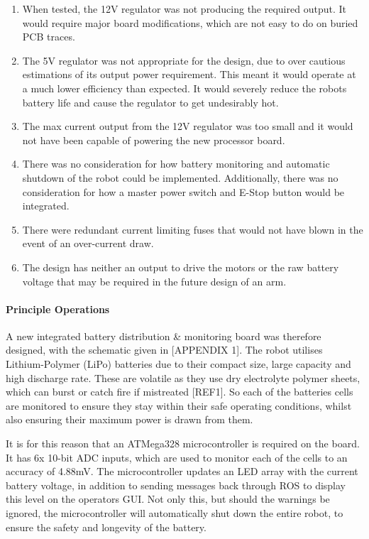 \begin{enumerate}
\item When tested, the 12V regulator was not producing the required output. It would require major board modifications, which are not easy to do on buried PCB traces.
\item The 5V regulator was not appropriate for the design, due to over cautious estimations of its output power requirement. This meant it would operate at a much lower efficiency than expected. It would severely reduce the robots battery life and cause the regulator to get undesirably hot. 
\item The max current output from the 12V regulator was too small and it would not have been capable of powering the new processor board. 
\item There was no consideration for how battery monitoring and automatic shutdown of the robot could be implemented. Additionally, there was no consideration for how a master power switch and E-Stop button would be integrated. 
\item There were redundant current limiting fuses that would not have blown in the event of an over-current draw.
\item The design has neither an output to drive the motors or the raw battery voltage that may be required in the future design of an arm.
\end{enumerate}

\paragraph{Principle Operations}
A new integrated battery distribution \& monitoring board was therefore designed, with the schematic given in [APPENDIX 1]. The robot utilises Lithium-Polymer (LiPo) batteries due to their compact size, large capacity and high discharge rate. These are volatile as they use dry electrolyte polymer sheets, which can burst or catch fire if mistreated [REF1]. So each of the batteries cells are monitored to ensure they stay within their safe operating conditions, whilst also ensuring their maximum power is drawn from them.\par

It is for this reason that an ATMega328 microcontroller is required on the board. It has 6x 10-bit ADC inputs, which are used to monitor each of the cells to an accuracy of 4.88mV. The microcontroller updates an LED array with the current battery voltage, in addition to sending messages back through ROS to display this level on the operators GUI. Not only this, but should the warnings be ignored, the microcontroller will automatically shut down the entire robot, to ensure the safety and longevity of the battery.\par

